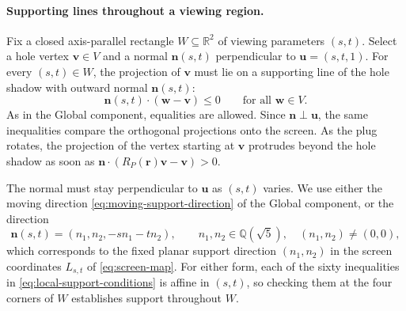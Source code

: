 \paragraph{Supporting lines throughout a viewing region.}
Fix a closed axis-parallel rectangle $W\subseteq\mathbb R^2$ of viewing
parameters $(s,t)$.
Select a hole vertex $\mathbf v\in V$ and a normal $\mathbf n(s,t)$ perpendicular
to $\mathbf u=(s,t,1)$. For every $(s,t)\in W$,
the projection of $\mathbf v$ must lie on a supporting line of the hole
shadow with outward normal $\mathbf n(s,t)$:
\begin{equation}\label{eq:local-support-conditions}
  \mathbf n(s,t)\cdot(\mathbf w-\mathbf v)\le0
  \qquad\text{for all }\mathbf w\in V.
\end{equation}
As in the Global component, equalities are allowed. Since $\mathbf n\perp\mathbf u$,
the same inequalities compare the orthogonal projections onto the screen.
As the plug rotates, the projection of the vertex starting at $\mathbf v$
protrudes beyond the hole shadow as soon as
$\mathbf n\cdot(R_P(\mathbf r)\mathbf v-\mathbf v)>0$.

The normal must stay perpendicular to $\mathbf u$ as $(s,t)$ varies. We use
either the moving direction \cref{eq:moving-support-direction} of the
Global component, or the direction
\begin{equation}\label{eq:local-fixed-screen-direction}
  \mathbf n(s,t)=(n_1,n_2,-sn_1-tn_2),
  \qquad n_1,n_2\in\mathbb Q(\sqrt5),\quad(n_1,n_2)\ne(0,0),
\end{equation}
which corresponds to the fixed planar support direction $(n_1,n_2)$ in the
screen coordinates $L_{s,t}$ of \cref{eq:screen-map}. For either form, each
of the sixty inequalities in \cref{eq:local-support-conditions} is affine
in $(s,t)$, so checking them at the four corners of $W$ establishes
support throughout $W$.

